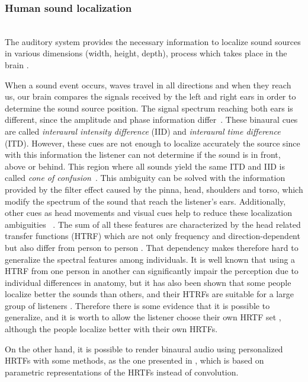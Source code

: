 \documentclass[journal]{IEEEtran}
\begin{document}
\subsubsection*{Human sound localization}~\\

The auditory system provides the necessary information to localize sound sources in various dimensions (width, height, depth), process which takes place in the brain \cite{Rumsey2001}.

When a sound event occurs, waves travel in all directions and when  they  reach us,  our  brain  compares  the signals  received  by  the  left  and  right  ears  in order to determine the sound source position.  The signal spectrum reaching both ears is different, since the amplitude and phase information differ~\cite{Rumsey2001}. These binaural cues are  called  \emph{interaural  intensity  difference}  (IID)  and  \emph{interaural time  difference}  (ITD). However, these cues are not enough to localize accurately the source since with this information the listener can not determine if the sound is in front, above or behind. This region where all sounds yield the same ITD and IID is called \textit{cone of confusion}~\cite{SpatialAudio2007}.
This ambiguity can be solved with the information provided by the filter effect caused by the pinna, head, shoulders and torso, which modify the spectrum of the sound that reach the listener's ears. Additionally, other cues as head movements and visual cues  help to reduce these localization ambiguities ~\cite{SpatialAudio2007}.  The sum of all these features are characterized by the head related transfer functions (HTRF) which are not only frequency and direction-dependent but also differ from person to person \cite{Rumsey2001}. That dependency makes therefore hard to generalize the spectral features among individuals. It is well known that using a HTRF from one person in another can significantly impair the  perception due to individual differences in anatomy, but it has also been shown that some people localize better the sounds than others, and their HTRFs are suitable for a large group of listeners \cite{SpatialAudio2007}. Therefore there is some evidence that it is possible to generalize, and it is worth to allow the listener choose their own HRTF set \cite{Tame2012}, although the people localize better with their own HRTFs. 

On the other hand, it is possible to render binaural audio using personalized HRTFs with some methods, as the one presented in \cite{SpatialAudio2007}, which is based on parametric representations of the HRTFs instead of convolution.\\
\end{document}
